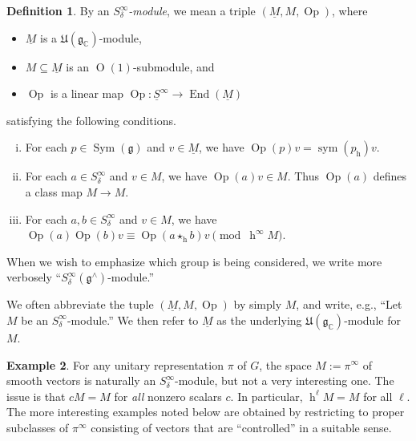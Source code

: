 \documentclass[reqno]{amsart}
\DeclareMathOperator{\h}{h}
\DeclareMathOperator{\End}{End}
\DeclareMathOperator{\Sym}{Sym}
\def\O{\operatorname{O}}
\DeclareMathOperator{\Opp}{Op}
\DeclareMathOperator{\sym}{sym}
\theoremstyle{plain} \newtheorem{theorem} {Theorem}
\theoremstyle{definition} \newtheorem{definition} [theorem] {Definition}
\newtheorem{example} [theorem] {Example}
\theoremstyle{itplain} %
\numberwithin{equation}{section}
\numberwithin{theorem}{section}
\begin{document}
\begin{definition}\label{defn:s-infinity-delta-module}
  By an \emph{$S_\delta^\infty$-module}, we mean a triple $(\underline{M}, M, \Opp)$, where
  \begin{itemize}
  \item $\underline{M}$ is a $\mathfrak{U}(\mathfrak{g}_\mathbb{C})$-module,
  \item $M \subseteq \underline{M}$ is an $\O(1)$-submodule, and
  \item $\Opp$ is a linear map $\Opp : \underline{S}^\infty \rightarrow \End(\underline{M})$
  \end{itemize}
  satisfying the following conditions.
  \begin{enumerate}[(i)]
  \item  \label{item:Sinfdelmod-1} For each $p \in \Sym(\mathfrak{g})$ and $v \in \underline{M}$, we have $\Opp(p) v = \sym(p_{\h}) v$.
  \item \label{item:Sinfdelmod-2} For each $a \in S_\delta^\infty$ and $v \in M$, we have $\Opp(a) v \in M$.  Thus $\Opp(a)$ defines a class map $M \rightarrow M$.
  \item \label{item:Sinfdelmod-3} For each $a,b \in S^\infty_\delta$ and $v \in M$, we have $\Opp(a) \Opp(b) v \equiv \Opp(a \star_{\h} b) v \pmod{\h^\infty M}$.
  \end{enumerate}
  When we wish to emphasize which group is being considered, we write more verbosely ``$S^\infty_\delta(\mathfrak{g}^\wedge)$-module.''
\end{definition}
We often abbreviate the tuple $(\underline{M}, M, \Opp)$ by simply $M$, and write, e.g., ``Let $M$ be an $S_\delta^\infty$-module.''  We then refer to $\underline{M}$ as the underlying $\mathfrak{U}(\mathfrak{g}_\mathbb{C})$-module for $M$.

\begin{example}
  For any unitary representation $\pi$ of $G$, the space $M := \pi^\infty$ of smooth vectors is naturally an $S_\delta^\infty$-module, but not a very interesting one.  The issue is that $c M = M$ for \emph{all} nonzero scalars $c$.  In particular, $\h^\ell M = M$ for all $\ell$.  The more interesting examples noted below are obtained by restricting to proper subclasses of $\pi^{\infty}$ consisting of vectors that are ``controlled'' in a suitable sense.
\end{example}
\end{document}
